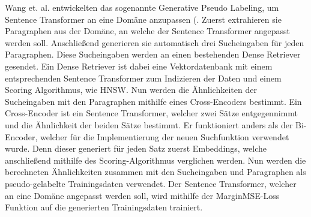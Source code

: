 Wang et. al. entwickelten das sogenannte Generative Pseudo Labeling, um Sentence Transformer an eine Domäne anzupassen (\cite{Wang_Thakur_Reimers_Gurevych_2022}.
Zuerst extrahieren sie Paragraphen aus der Domäne, an welche der Sentence Transformer angepasst werden soll.
Anschließend generieren sie automatisch drei Sucheingaben für jeden Paragraphen.
Diese Sucheingaben werden an einen bestehenden Dense Retriever gesendet.
Ein Dense Retriever ist dabei eine Vektordatenbank mit einem entsprechenden Sentence Transformer zum Indizieren der Daten und einem Scoring Algorithmus, wie HNSW. 
Nun werden die Ähnlichkeiten der Sucheingaben mit den Paragraphen mithilfe eines Cross-Encoders bestimmt.
Ein Cross-Encoder ist ein Sentence Transformer, welcher zwei Sätze entgegennimmt und die Ähnlichkeit der beiden Sätze bestimmt.
Er funktioniert anders als der Bi-Encoder, welcher für die Implementierung der neuen Suchfunktion verwendet wurde.
Denn dieser generiert für jeden Satz zuerst Embeddings, welche anschließend mithilfe des Scoring-Algorithmus verglichen werden.
Nun werden die berechneten Ähnlichkeiten zusammen mit den Sucheingaben und Paragraphen als pseudo-gelabelte Trainingsdaten verwendet.
Der Sentence Transformer, welcher an eine Domäne angepasst werden soll, wird mithilfe der MarginMSE-Loss Funktion auf die generierten Trainingsdaten trainiert.\\  

